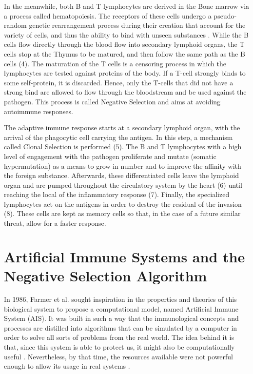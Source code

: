 In the meanwhile, both B and T lymphocytes are derived in the Bone marrow via a process called hematopoiesis. The receptors of these cells undergo a pseudo-random genetic rearrangement process during their creation that account for the variety of cells, and thus the ability to bind with unseen substances \cite{AIS2014}. While the B cells flow directly through the blood flow into secondary lymphoid organs, the T cells stop at the Thymus to be matured, and then follow the same path as the B cells (4). The maturation of the T cells is a censoring process in which the lymphocytes are tested against proteins of the body. If a T-cell strongly binds to some self-protein, it is discarded. Hence, only the T-cells that did not have a strong bind are allowed to flow through the bloodstream and be used against the pathogen. This process is called Negative Selection and aims at avoiding autoimmune responses.

The adaptive immune response starts at a secondary lymphoid organ, with the arrival of the phagocytic cell carrying the antigen. In this step, a mechanism called Clonal Selection is performed (5). The B and T lymphocytes with a high level of engagement with the pathogen proliferate and mutate (somatic hypermutation) as a means to grow in number and to improve the affinity with the foreign substance. Afterwards, these differentiated cells leave the lymphoid organ and are pumped throughout the circulatory system by the heart (6) until reaching the local of the inflammatory response (7). Finally, the specialized lymphocytes act on the antigens in order to destroy the residual of the invasion (8). These cells are kept as memory cells so that, in the case of a future similar threat, allow for a faster response. 

\section{Artificial Immune Systems and the Negative Selection Algorithm} \label{sec:bgNSA}

In 1986, Farmer et al. \cite{ImmuneSysAdapML1986} sought inspiration in the properties and theories of this biological system to propose a computational model, named Artificial Immune System (AIS). It was built in such a way that the immunological concepts and processes are distilled into algorithms that can be simulated by a computer in order to solve all sorts of problems from the real world. The idea behind it is that, since this system is able to protect us, it might also be computationally useful \cite{EvaluateAIS2005}. Nevertheless, by that time, the resources available were not powerful enough to allow its usage in real systems \cite{AdaptiveImmunitySAS2021}.

